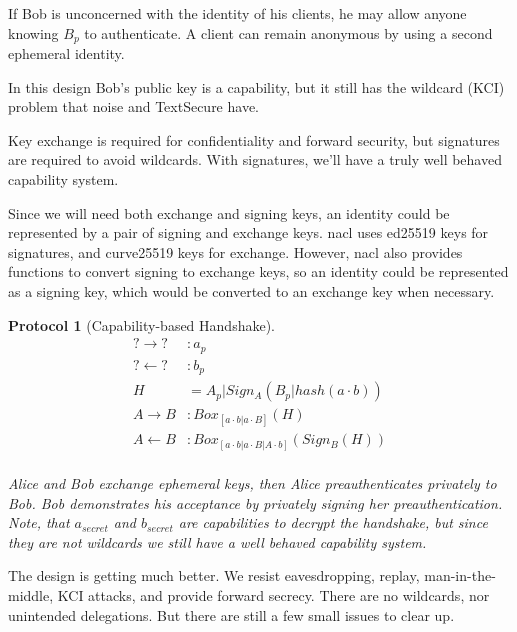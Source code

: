 \documentclass[12pt]{article}
\newtheorem{proto}{Protocol}
\begin{document}
If Bob is unconcerned with the identity of his clients,
he may allow anyone knowing $B_p$ to authenticate. A client can
remain anonymous by using a second ephemeral identity.

In this design Bob's public key is a capability,
but it still has the wildcard (KCI) problem that
noise and TextSecure have.

Key exchange is required for confidentiality and
forward security, but signatures are required to avoid wildcards.
With signatures, we'll have a truly well behaved capability system.

Since we will need both exchange and signing keys,
an identity could be represented by a pair of signing and exchange keys.
nacl uses ed25519 keys for signatures, and
curve25519 keys for exchange. However, nacl also provides
functions to convert signing to exchange keys,
so an identity could be represented as a signing key,
which would be converted to an exchange key when necessary.

\begin{samepage}
\begin{proto}[Capability-based Handshake]

  $$
  \begin{align*}
      ? \to ? &: a_{p}   \\
      ? \gets ? &: b_{p} \\
      H &= A_{p}|Sign_A(B_{p}|hash(a \cdot b)) \\
      A \to B &: Box_{[a \cdot b | a \cdot B]}(H)\\
      A \gets B &: Box_{[a \cdot b | a \cdot B | A \cdot b]}(Sign_B(H) )\\
  \end{align*}
  $$

  Alice and Bob exchange ephemeral keys, then Alice
  preauthenticates privately to Bob. Bob demonstrates his acceptance
  by privately signing her preauthentication.
  Note, that $a_{secret}$ and $b_{secret}$ are capabilities to decrypt
  the handshake, but since they are not wildcards we still have a well
  behaved capability system.

\end{proto}
\end{samepage}

The design is getting much better. We resist eavesdropping, replay,
man-in-the-middle, KCI attacks, and provide forward secrecy.
There are no wildcards, nor unintended delegations.
But there are still a few small issues to clear up.
\end{document}
